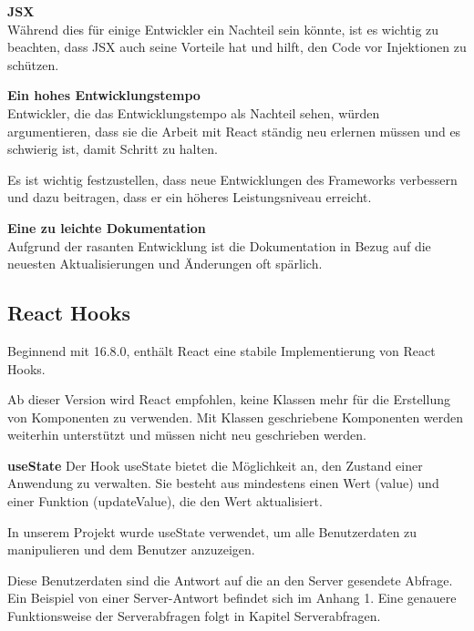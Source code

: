 \textbf{JSX}\\
Während dies für einige Entwickler ein Nachteil sein könnte, ist es wichtig zu beachten, dass JSX auch seine Vorteile hat und hilft, den Code vor Injektionen zu schützen.{\cite{R02}}
\newline

\textbf{Ein hohes Entwicklungstempo}\\
Entwickler, die das Entwicklungstempo als Nachteil sehen, würden argumentieren, dass sie die Arbeit mit React ständig neu erlernen müssen und es schwierig ist, damit Schritt zu halten.

Es ist wichtig festzustellen, dass neue Entwicklungen des Frameworks verbessern und dazu beitragen, dass er ein höheres Leistungsniveau erreicht.
\newline

\textbf{Eine zu leichte Dokumentation}\\
Aufgrund der rasanten Entwicklung ist die Dokumentation in Bezug auf die neuesten Aktualisierungen und Änderungen oft spärlich.{\cite{R01}}

\subsection{React Hooks}
Beginnend mit 16.8.0, enthält React eine stabile Implementierung von React Hooks.

Ab dieser Version wird React empfohlen, keine Klassen mehr für die Erstellung von Komponenten zu verwenden.
Mit Klassen geschriebene Komponenten werden weiterhin unterstützt und müssen nicht neu geschrieben werden.
{\cite{R05}}

\textbf{useState}
Der Hook useState bietet die Möglichkeit an, den Zustand einer Anwendung zu verwalten. Sie besteht aus mindestens einen Wert (value) und einer Funktion (updateValue), die den Wert aktualisiert.

In unserem Projekt wurde useState verwendet, um alle Benutzerdaten zu manipulieren und dem Benutzer anzuzeigen.

Diese Benutzerdaten sind die Antwort auf die an den Server gesendete Abfrage.
Ein Beispiel von einer Server-Antwort befindet sich im Anhang 1.
Eine genauere Funktionsweise der Serverabfragen folgt in Kapitel Serverabfragen.
\\

